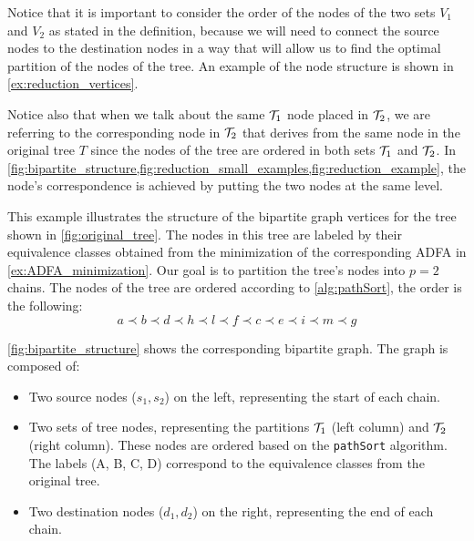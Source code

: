 Notice that it is important to consider the order of the nodes of the two sets $V_1$ and $V_2$ as stated in the definition, because we will need to connect the source nodes to the destination nodes in a way that will allow us to find the optimal partition of the nodes of the tree. An example of the node structure is shown in \cref{ex:reduction_vertices}.

Notice also that when we talk about the same $\treeset{1}$ node placed in $\treeset{2}$, we are referring to the corresponding node in $\treeset{2}$ that derives from the same node in the original tree $T$ since the nodes of the tree are ordered in both sets $\treeset{1}$ and $\treeset{2}$. In \cref{fig:bipartite_structure,fig:reduction_small_examples,fig:reduction_example}, the node's correspondence is achieved by putting the two nodes at the same level.
\begin{example}[Vertices] \label{ex:reduction_vertices}
    This example illustrates the structure of the bipartite graph vertices for the tree shown in \cref{fig:original_tree}. The nodes in this tree are labeled by their equivalence classes obtained from the minimization of the corresponding ADFA in \cref{ex:ADFA_minimization}. Our goal is to partition the tree's nodes into $p=2$ chains. The nodes of the tree are ordered according to \cref{alg:pathSort}, the order is the following: 
    \[
        a \prec b \prec d \prec h \prec l \prec f \prec c \prec e \prec i \prec m \prec g
    \]

    \cref{fig:bipartite_structure} shows the corresponding bipartite graph. The graph is composed of:
    \begin{itemize}
        \item Two source nodes ($s_1, s_2$) on the left, representing the start of each chain.
        \item Two sets of tree nodes, representing the partitions $\treeset{1}$ (left column) and $\treeset{2}$ (right column). These nodes are ordered based on the \texttt{pathSort} algorithm. The labels (A, B, C, D) correspond to the equivalence classes from the original tree.
        \item Two destination nodes ($d_1, d_2$) on the right, representing the end of each chain.
    \end{itemize}

    \begin{figure}[H]
        \centering
        \begin{tikzpicture}[
            level distance=1.5cm,
            sibling distance=3cm,
            state/.style={circle, draw, minimum size=7mm},
            accepting/.style={circle, draw, double, minimum size=7mm},
            edge from parent/.style={draw, -latex},
            level 1/.style={sibling distance=4cm},
            level 2/.style={sibling distance=2.5cm},
            level 3/.style={sibling distance=2cm}
            ]
        

\end{tikzpicture}
\end{figure}
\end{example}
